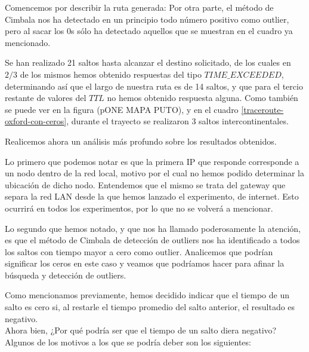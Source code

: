 Comencemos por describir la ruta generada:
 Por otra parte, el método de Cimbala nos ha detectado en un principio todo número positivo como outlier, pero al sacar los 0s sólo ha detectado aquellos que se muestran en el cuadro ya mencionado.

Se han realizado 21 saltos hasta alcanzar el destino solicitado, de los cuales en $2/3$ de los mismos hemos obtenido respuestas del tipo $TIME\_EXCEEDED$, determinando así que el largo de nuestra ruta es de 14 saltos, y que para el tercio restante de valores del $TTL$ no hemos obtenido respuesta alguna. Como también se puede ver en la figura (pONE MAPA PUTO), y en el cuadro \ref{traceroute-oxford-con-ceros}, durante el trayecto se realizaron 3 saltos intercontinentales.

Realicemos ahora un análisis más profundo sobre los resultados obtenidos.

Lo primero que podemos notar es que la primera IP que responde corresponde a un nodo dentro de la red local, motivo por el cual no hemos podido determinar la ubicación de dicho nodo. Entendemos que el mismo se trata del gateway que separa la red LAN desde la que hemos lanzado el experimento, de internet. Esto ocurrirá en todos los experimentos, por lo que no se volverá a mencionar. 

Lo segundo que hemos notado, y que nos ha llamado poderosamente la atención, es que el método de Cimbala de detección de outliers nos ha identificado a todos los saltos con tiempo mayor a cero como outlier. Analicemos que podrían significar los ceros en este caso y veamos que podríamos hacer para afinar la búsqueda y detección de outliers.

Como mencionamos previamente, hemos decidido indicar que el tiempo de un salto es cero si, al restarle el tiempo promedio del salto anterior, el resultado es negativo. \\
Ahora bien, ¿Por qué podría ser que el tiempo de un salto diera negativo? \\
Algunos de los motivos a los que se podría deber son los siguientes:

